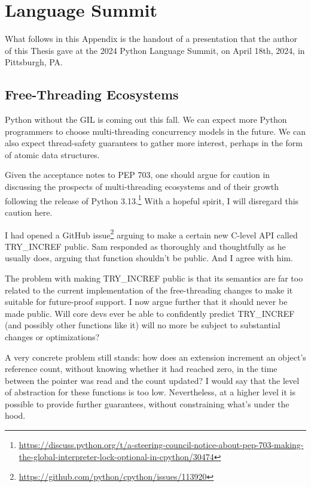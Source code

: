 \chapter{Language Summit}\label{ch:language-summit}

What follows in this Appendix is the handout of a presentation that the author of this Thesis gave at the 2024 Python Language Summit, on April 18th, 2024, in Pittsburgh, PA\@.


\section*{Free-Threading Ecosystems}\label{sec:free-threading-ecosystems}

Python without the GIL is coming out this fall.
We can expect more Python programmers to choose multi-threading concurrency models in the future.
We can also expect thread-safety guarantees to gather more interest, perhaps in the form of atomic data structures.

Given the acceptance notes to PEP 703, one should argue for caution in discussing the prospects of multi-threading ecosystems and of their growth following the release of Python 3.13.\footnote{%
    \url{https://discuss.python.org/t/a-steering-council-notice-about-pep-703-making-the-global-interpreter-lock-optional-in-cpython/30474}
}
With a hopeful spirit, I will disregard this caution here.

I had opened a GitHub issue\footnote{%
    \url{https://github.com/python/cpython/issues/113920}
} arguing to make a certain new C-level API called TRY\_INCREF public.
Sam responded as thoroughly and thoughtfully as he usually does, arguing that function shouldn't be public.
And I agree with him.

The problem with making TRY\_INCREF public is that its semantics are far too related to the current implementation of the free-threading changes to make it suitable for future-proof support.
I now argue further that it should never be made public.
Will core devs ever be able to confidently predict TRY\_INCREF (and possibly other functions like it) will no more be subject to substantial changes or optimizations?

A very concrete problem still stands:  how does an extension increment an object's reference count, without knowing whether it had reached zero, in the time between the pointer was read and the count updated?
I would say that the level of abstraction for these functions is too low.
Nevertheless, at a higher level it is possible to provide further guarantees, without constraining what's under the hood.

